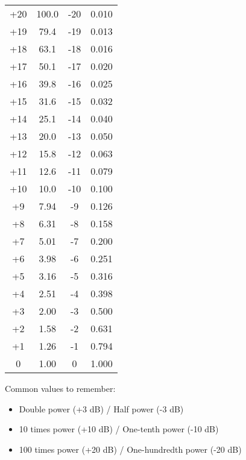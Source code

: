 \begin{figure}[h]
\begin{minipage}{0.48\textwidth}
\begin{tabular}{|c|c||c|c|}
            \hline
            +20 & 100.0 & -20 & 0.010 \\
            +19 & 79.4 & -19 & 0.013 \\
            +18 & 63.1 & -18 & 0.016 \\
            +17 & 50.1 & -17 & 0.020 \\
            +16 & 39.8 & -16 & 0.025 \\
            +15 & 31.6 & -15 & 0.032 \\
            +14 & 25.1 & -14 & 0.040 \\
            +13 & 20.0 & -13 & 0.050 \\
            +12 & 15.8 & -12 & 0.063 \\
            +11 & 12.6 & -11 & 0.079 \\
            +10 & 10.0 & -10 & 0.100 \\
            +9 & 7.94 & -9 & 0.126 \\
            +8 & 6.31 & -8 & 0.158 \\
            +7 & 5.01 & -7 & 0.200 \\
            +6 & 3.98 & -6 & 0.251 \\
            +5 & 3.16 & -5 & 0.316 \\
            +4 & 2.51 & -4 & 0.398 \\
            +3 & 2.00 & -3 & 0.500 \\
            +2 & 1.58 & -2 & 0.631 \\
            +1 & 1.26 & -1 & 0.794 \\
            0 & 1.00 & 0 & 1.000 \\
            \hline
        \end{tabular}
        \label{tab:db-power-ratios}
    \end{minipage}
    \begin{tcolorbox}[colback=gray!10!white,colframe=black!75!black,title={Key Points}]
        Common values to remember:
        \begin{itemize}[noitemsep]            \item Double power (+3 dB) / Half power (-3 dB)
            \item 10 times power (+10 dB) / One-tenth power (-10 dB)
            \item 100 times power (+20 dB) / One-hundredth power (-20 dB)
        \end{itemize}
        \end{tcolorbox}
        \end{figure}

